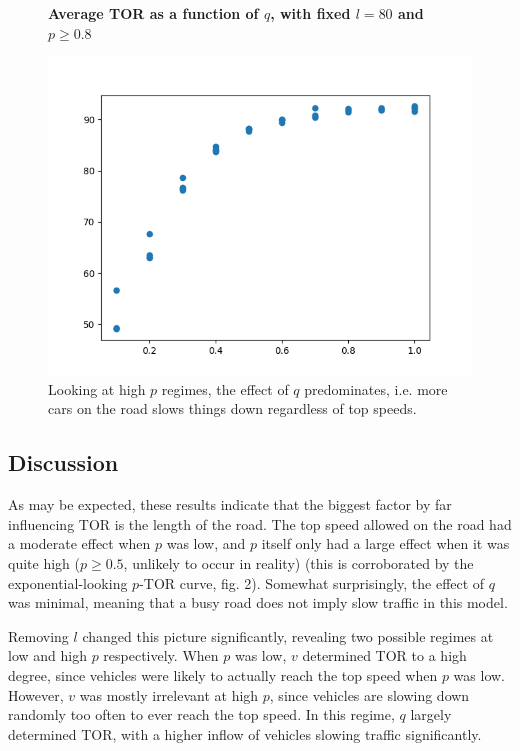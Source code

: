 \documentclass{article}
\begin{document}
\begin{figure}
\textbf{\large Average TOR as a function of $q$, with fixed $l=80$ and $p \geq 0.8$}\par\medskip
{}
\includegraphics[scale = 0.55, left]{./data/phase1/q_vs_timeOnRoad_l=80_highp.png}
\vspace*{0.1cm}\hspace*{4.5cm}{\large $q$}
\caption{\label{fig} Looking at high $p$ regimes, the effect of $q$ predominates, i.e. more cars on the road slows things down regardless of top speeds.}
\end{figure}

\subsection*{Discussion}

As may be expected, these results indicate that the biggest factor by far influencing TOR is the length of the road. The top speed allowed on the road had a moderate effect when $p$ was low, and $p$ itself only had a large effect when it was quite high ($p \geq 0.5$, unlikely to occur in reality) (this is corroborated by the exponential-looking $p$-TOR curve, fig. 2). Somewhat surprisingly, the effect of $q$ was minimal, meaning that a busy road does not imply slow traffic in this model.

Removing $l$ changed this picture significantly, revealing two possible regimes at low and high $p$ respectively. When $p$ was low, $v$ determined TOR to a high degree, since vehicles were likely to actually reach the top speed when $p$ was low. However, $v$ was mostly irrelevant at high $p$, since vehicles are slowing down randomly too often to ever reach the top speed. In this regime, $q$ largely determined TOR, with a higher inflow of vehicles slowing traffic significantly.
\end{document}
